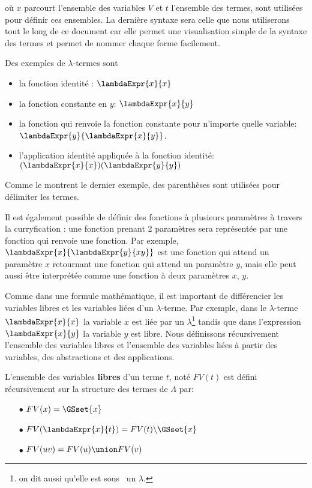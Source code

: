 où $x$ parcourt l'ensemble des variables $V$ et $t$ l'ensemble des termes, sont
utilisées pour définir ces ensembles. La dernière syntaxe sera celle que nous
utiliserons tout le long de ce document car elle permet une visualisation simple
de la syntaxe des termes et permet de nommer chaque forme facilement.

Des exemples de $\lambda$-termes sont
\begin{itemize}
  \item la fonction identité : $\lambdaExpr{x}{x}$
  \item la fonction constante en $y$: $\lambdaExpr{x}{y}$
  \item la fonction qui renvoie la fonction constante pour n'importe quelle
    variable: $\lambdaExpr{y}{\lambdaExpr{x}{y}}$.
  \item l'application identité appliquée à la fonction identité:
    $(\lambdaExpr{x}{x}) (\lambdaExpr{y}{y})$
\end{itemize}

Comme le montrent le dernier exemple, des parenthèses sont utilisées pour
délimiter les termes.

Il est également possible de définir des fonctions à plusieurs paramètres à
travers la curryfication : une fonction prenant 2 paramètres sera représentée
par une fonction qui renvoie une fonction. Par exemple,
$\lambdaExpr{x}{\lambdaExpr{y}{x y}}$ est une fonction qui attend un paramètre
$x$ retournant une fonction qui attend un paramètre $y$,
mais elle peut aussi être interprétée comme une fonction à deux paramètres $x$, $y$.

Comme dans une formule mathématique, il est important de différencier les
variables libres et les variables liées d'un $\lambda$-terme. Par exemple, dans
le $\lambda$-terme $\lambdaExpr{x}{x}$ la variable $x$ est liée par un
$\lambda$\footnote{on dit aussi qu'elle est \og sous \fg \, un $\lambda$.}
tandis que dans l'expression $\lambdaExpr{x}{y}$ la variable $y$ est libre.
Nous définissons récursivement l'ensemble des variables libres et l'ensemble des
variables liées à partir des variables, des abstractions et des applications.

\begin{definition} 
  L'ensemble des variables \textbf{libres} d'un terme $t$, noté $FV(t)$ est défini
  récursivement sur la structure des termes de $\Lambda$ par:
  \begin{itemize}
  \item[$\bullet$] $FV(x) = \GSset{x}$
  \item[$\bullet$] $FV(\lambdaExpr{x}{t}) = FV(t) \backslash \GSset{x}$
  \item[$\bullet$] $FV(u v) = FV(u) \union FV(v)$
  \end{itemize}
\end{definition}

